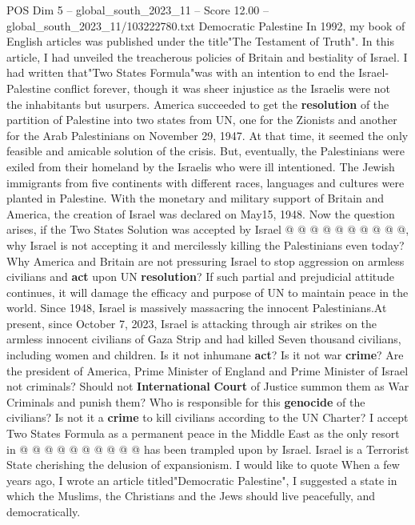 \begin{textsample}{POS Dim 5 – global\_south\_2023\_11 – Score 12.00 – global\_south\_2023\_11/103222780.txt}  \label{ex:f5_pos_257}
Democratic Palestine In 1992, my book of English articles was published under the title"The Testament of Truth".
In this article, I had unveiled the treacherous policies of Britain and bestiality of Israel.
I had written that"Two States Formula"was with an intention to end the Israel- Palestine conflict forever, though it was sheer injustice as the Israelis were not the inhabitants but usurpers.
America succeeded to get the \textbf{resolution} of the partition of Palestine into two states from UN, one for the Zionists and another for the Arab Palestinians on November 29, 1947.
At that time, it seemed the only feasible and amicable solution of the crisis.
But, eventually, the Palestinians were exiled from their homeland by the Israelis who were ill intentioned.
The Jewish immigrants from five continents with different races, languages and cultures were planted in Palestine.
With the monetary and military support of Britain and America, the creation of Israel was declared on May15, 1948.
Now the question arises, if the Two States Solution was accepted by Israel @ @ @ @ @ @ @ @ @ @, why Israel is not accepting it and mercilessly killing the Palestinians even today?
Why America and Britain are not pressuring Israel to stop aggression on armless civilians and \textbf{act} upon UN \textbf{resolution}?
If such partial and prejudicial attitude continues, it will damage the efficacy and purpose of UN to maintain peace in the world.
Since 1948, Israel is massively massacring the innocent Palestinians.At present, since October 7, 2023, Israel is attacking through air strikes on the armless innocent civilians of Gaza Strip and had killed Seven thousand civilians, including women and children.
Is it not inhumane \textbf{act}?
Is it not war \textbf{crime}?
Are the president of America, Prime Minister of England and Prime Minister of Israel not criminals?
Should not \textbf{International} \textbf{Court} of Justice summon them as War Criminals and punish them?
Who is responsible for this \textbf{genocide} of the civilians?
Is not it a \textbf{crime} to kill civilians according to the UN Charter?
I accept Two States Formula as a permanent peace in the Middle East as the only resort in @ @ @ @ @ @ @ @ @ @ has been trampled upon by Israel.
Israel is a Terrorist State cherishing the delusion of expansionism.
I would like to quote When a few years ago, I wrote an article titled"Democratic Palestine", I suggested a state in which the Muslims, the Christians and the Jews should live peacefully, and democratically.

\end{textsample}
